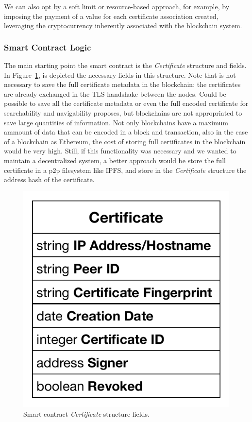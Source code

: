 We can also opt by a soft limit or resource-based approach, for example, by imposing the payment of a value for each certificate association created, leveraging the cryptocurrency inherently associated with the blockchain system.

\subsubsection{Smart Contract Logic}
The main starting point the smart contract is the \textit{Certificate} structure and fields.
In Figure~\ref{fig:certificate-structure}, is depicted the necessary fields in this structure.
Note that is not necessary to save the full certificate metadata in the blockchain: the certificates are already exchanged in the TLS handshake between the nodes.
Could be possible to save all the certificate metadata or even the full encoded certificate for searchability and navigability proposes, but blockchains are not appropriated to save large quantities of information.
Not only blockchains have a maximum ammount of data that can be encoded in a block and transaction, also in the case of a blockchain as Ethereum, the cost of storing full certificates in the blockchain would be very high.
Still, if this functionality was necessary and we wanted to maintain a decentralized system, a better approach would be store the full certificate in a \ac{p2p} filesystem like \ac{IPFS}, and store in the \textit{Certificate} structure the address hash of the certificate.

\begin{figure}
  \centering
  \includegraphics[scale=0.5]{Figures/certificate-structure.pdf}
  \caption{Smart contract \textit{Certificate} structure fields.}
\label{fig:certificate-structure}
\end{figure}

